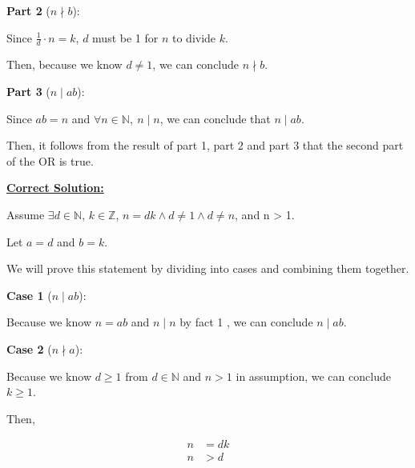 \documentclass[12pt]{article}
\begin{document}
\begin{enumerate}
    \bigskip

    \textbf{Part 2} ($n \nmid b$):

    Since $\frac{1}{d} \cdot n = k$, $d$ must be 1 for $n$ to divide $k$.

    \bigskip

    Then, because we know $d \neq 1$, we can conclude $n \nmid b$.

    \textbf{Part 3} ($n \mid ab$):

    Since $ab = n$ and $\forall n \in \mathbb{N},\:n \mid n$, we can conclude that $n \mid ab$.

    \bigskip

    Then, it follows from the result of part 1, part 2 and part 3 that the second
    part of the OR is true.

    \begin{mdframed}

        \underline{\textbf{Correct Solution:}}

        \bigskip

        Assume $\exists d \in \mathbb{N}$, $k \in \mathbb{Z}$, $n = dk \land
        d \neq 1 \land d \neq n$, and n > 1.

        \bigskip

        Let $a = d$ and $b = k$.

        \bigskip

        We will prove this statement by dividing into cases and combining them
        together.

        \bigskip

        \textbf{Case 1} ($n \mid ab$):

        \bigskip

        Because we know $n = ab$ and $n \mid n$ by fact 1 , we can conclude
        $n \mid ab$.

        \bigskip

        \textbf{Case 2} ($n \nmid a$):

        \bigskip

        Because we know $d \geq 1$ from $d \in \mathbb{N}$ and $n > 1$ in
        assumption, we can conclude $k \geq 1$.

        \bigskip

        Then,

        \begin{align}
            n &= dk\\
            n &> d
        \end{align}


\end{mdframed}
\end{enumerate}
\end{document}
